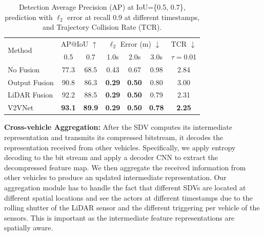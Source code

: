 \documentclass[runningheads]{llncs}
\begin{document}
\begin{table}[t]
  \centering
  \begin{tabular}{l | c  c | c c c |  c}
    \hline
    \multirow{2}{*}{Method} & \multicolumn{2}{c|}{AP@IoU $\uparrow$}
                            & \multicolumn{3}{c|}{$\ell_2$ Error (m) $\downarrow$}
                            & \multicolumn{1}{c}{TCR $\downarrow$} \\
                  & 0.5 & 0.7 & 1.0s & 2.0s & 3.0s & $\tau=$0.01 \\ \hline
    No Fusion     & 77.3 & 68.5 & 0.43 & 0.67 & 0.98 & 2.84  \\
    Output Fusion  & 90.8 & 86.3 & \textbf{0.29} & \textbf{0.50} & 0.80 & 3.00 \\    
    LiDAR Fusion  & 92.2 & 88.5 & \textbf{0.29} & \textbf{0.50} & 0.79 & 2.31  \\
    V2VNet         & \textbf{93.1} & \textbf{89.9} &\textbf{0.29} & \textbf{0.50} & \textbf{0.78} & \textbf{2.25} \\
    \hline
  \end{tabular}
  \caption{Detection Average Precision (AP) at IoU=\{0.5, 0.7\}, prediction with $\ell_2$ error at recall 0.9 at different timestamps, and Trajectory Collision Rate (TCR).}
  \label{tab:general}
\end{table}

{\flushleft\bf Cross-vehicle Aggregation:}
After the SDV computes its intermediate representation and transmits
its compressed bitstream,
it decodes the representation received from other vehicles.
Specifically, we apply entropy decoding to the bit stream and apply a decoder CNN to extract the decompressed feature map.
We then aggregate the received information from other vehicles to
produce an updated intermediate representation.
Our aggregation module has to handle the fact that different SDVs are located at different spatial locations and see the actors at different timestamps due to the rolling shutter of the LiDAR sensor and the different triggering per vehicle of the sensors.
This is important as the intermediate feature representations are spatially aware.
\end{document}
